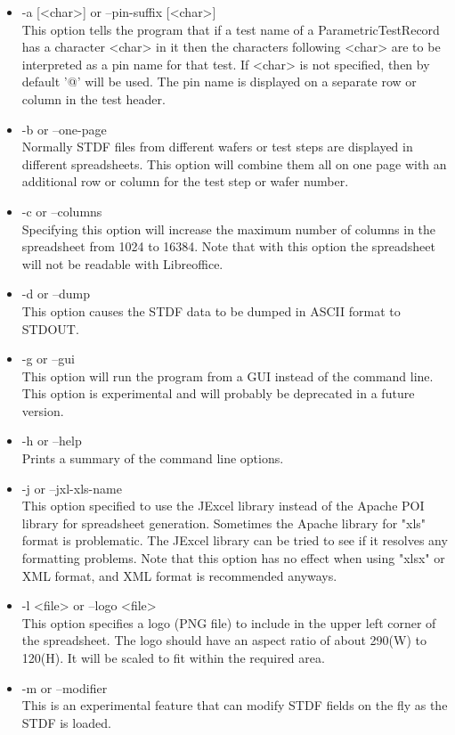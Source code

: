 \documentclass[letterpaper]{article}
\begin{document}
\begin{itemize}
\item -a [<char>] or --pin-suffix [<char>]\\
This option tells the program that if a test name of a ParametricTestRecord has
a character <char> in it then the characters following <char> are to be interpreted
as a pin name for that test.  If <char> is not specified, then by default '@' will be used.
The pin name is displayed on a separate row or column in the test header.
\item -b or --one-page\\
Normally STDF files from different wafers or test steps are displayed in different spreadsheets.
This option will combine them all on one page with an additional row or column for the test
step or wafer number.
\item -c or --columns\\
Specifying this option will increase the maximum number of columns in the spreadsheet
from 1024 to 16384.  Note that with this option the spreadsheet will not be
readable with Libreoffice.
\item -d or --dump\\
This option causes the STDF data to be dumped in ASCII format to STDOUT.
\item -g or --gui\\
This option will run the program from a GUI instead of the command line.  This option
is experimental and will probably be deprecated in a future version.
\item -h or --help\\
Prints a summary of the command line options.
\item -j or --jxl-xls-name\\
This option specified to use the JExcel library instead of the Apache POI library
for spreadsheet generation.  Sometimes the Apache library for "xls" format is problematic.
The JExcel library can be tried to see if it resolves any formatting problems.  Note
that this option has no effect when using "xlsx" or XML format, and XML format is
recommended anyways.
\item -l <file> or --logo <file>\\
This option specifies a logo (PNG file) to include in the upper left
corner of the spreadsheet.  The logo should have an aspect ratio of
about 290(W) to 120(H).  It will be scaled to fit within the required area.
\item -m or --modifier\\
This is an experimental feature that can modify STDF fields on the fly as the STDF is loaded.

\end{itemize}
\end{document}
